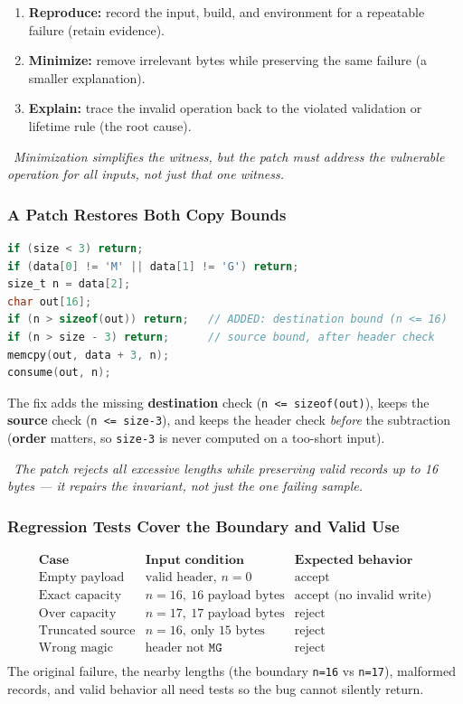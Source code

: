 \documentclass[hidelinks]{article}
\newcommand{\callout}[1]{\par\smallskip\noindent{\color{capri}$\blacktriangleright$}\ \textit{#1}\par\smallskip}
\begin{document}
\begin{enumerate}
    \item \textbf{Reproduce:} record the input, build, and environment for a repeatable failure (retain evidence).
    \item \textbf{Minimize:} remove irrelevant bytes while preserving the same failure (a smaller explanation).
    \item \textbf{Explain:} trace the invalid operation back to the violated validation or lifetime rule (the root cause).
\end{enumerate}

\callout{Minimization simplifies the \emph{witness}, but the patch must address the \emph{vulnerable operation} for \emph{all} inputs, not just that one witness.}

\subsubsection{A Patch Restores Both Copy Bounds}

\begin{lstlisting}[language=C]
if (size < 3) return;
if (data[0] != 'M' || data[1] != 'G') return;
size_t n = data[2];
char out[16];
if (n > sizeof(out)) return;   // ADDED: destination bound (n <= 16)
if (n > size - 3) return;      // source bound, after header check
memcpy(out, data + 3, n);
consume(out, n);
\end{lstlisting}
The fix adds the missing \textbf{destination} check (\texttt{n <= sizeof(out)}), keeps the \textbf{source} check (\texttt{n <= size-3}), and keeps the header check \emph{before} the subtraction (\textbf{order} matters, so \texttt{size-3} is never computed on a too-short input).

\callout{The patch rejects \emph{all} excessive lengths while preserving valid records up to 16 bytes --- it repairs the invariant, not just the one failing sample.}

\subsubsection{Regression Tests Cover the Boundary and Valid Use}

\[
\begin{array}{lll}
\textbf{Case} & \textbf{Input condition} & \textbf{Expected behavior}\\ \hline
\text{Empty payload}    & \text{valid header, } n=0              & \text{accept}\\
\text{Exact capacity}   & n=16,\ 16\text{ payload bytes}         & \text{accept (no invalid write)}\\
\text{Over capacity}    & n=17,\ 17\text{ payload bytes}         & \text{reject}\\
\text{Truncated source} & n=16,\ \text{only }15\text{ bytes}     & \text{reject}\\
\text{Wrong magic}      & \text{header not } \texttt{MG}         & \text{reject}\\
\end{array}
\]
The original failure, the nearby lengths (the boundary \texttt{n=16} vs \texttt{n=17}), malformed records, and valid behavior all need tests so the bug cannot silently return.
\end{document}
